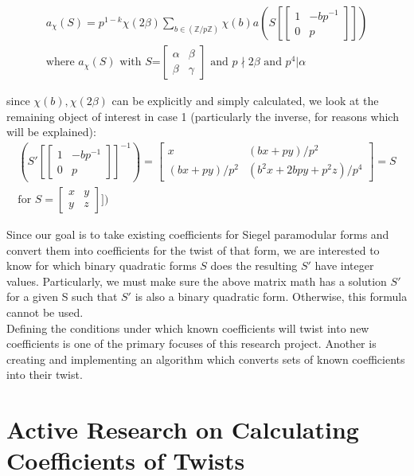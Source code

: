 \documentclass[11pt, oneside]{amsart}
\begin{document}
\begin{align*}
a_\chi (S)=p^{1-k}\chi(2\beta)\sum_{b\in (\mathbb{Z}/p\mathbb{Z})}\chi(b)a(S[
\begin{bmatrix}
1 &	-bp^{-1} \\
0 & p
\end{bmatrix}
])
\\
\text{where $a_\chi (S)$ with $S$=}
\begin{bmatrix}
\alpha &	\beta \\
\beta & \gamma
\end{bmatrix}
\text{ and } p\nmid 2\beta \text{ and } p^4\vert \alpha
\end{align*}

since $\chi(b),\chi(2\beta)$ can be explicitly and simply calculated, we look at the remaining object of interest in case 1 (particularly the inverse, for reasons which will be explained): 
\begin{align*}
(S'[
\begin{bmatrix}
1 &	-bp^{-1} \\
0 & p
\end{bmatrix}
]^{-1})
= 
\begin{bmatrix}
x &	(bx +py)/p^2 \\
(bx+py)/p^2 & (b^2x+2bpy+p^2z)/p^4
\end{bmatrix}
 = S
\\
\text{for } S=
\begin{bmatrix}
x &	y \\
y & z
\end{bmatrix}
])
\end{align*}

Since our goal is to take existing coefficients for Siegel paramodular forms and convert them into coefficients for the twist of that form, we are interested to know for which binary quadratic forms $S$ does the resulting $S'$ have integer values. Particularly, we must make sure the above matrix math has a solution $S'$ for a given S such that $S'$ is also a binary quadratic form. Otherwise, this formula cannot be used.\\
Defining the conditions under which known coefficients will twist into new coefficients is one of the primary focuses of this research project. Another is creating and implementing an algorithm which converts sets of known coefficients into their twist.

\section{Active Research on Calculating Coefficients of Twists}
\end{document}
